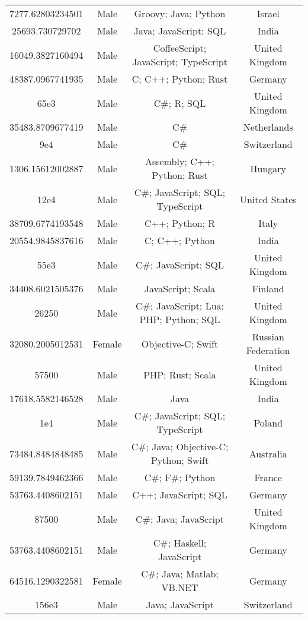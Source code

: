 \begin{center}
\begin{tabular}{ |c|c|c|c| }
7277.62803234501  &  Male  &  Groovy; Java; Python  &  Israel  \\ 
25693.730729702  &  Male  &  Java; JavaScript; SQL  &  India  \\ 
16049.3827160494  &  Male  &  CoffeeScript; JavaScript; TypeScript  &  United Kingdom  \\ 
48387.0967741935  &  Male  &  C; C++; Python; Rust  &  Germany  \\ 
65e3  &  Male  &  C\#; R; SQL  &  United Kingdom  \\ 
35483.8709677419  &  Male  &  C\#  &  Netherlands  \\ 
9e4  &  Male  &  C\#  &  Switzerland  \\ 
1306.15612002887  &  Male  &  Assembly; C++; Python; Rust  &  Hungary  \\ 
12e4  &  Male  &  C\#; JavaScript; SQL; TypeScript  &  United States  \\ 
38709.6774193548  &  Male  &  C++; Python; R  &  Italy  \\ 
20554.9845837616  &  Male  &  C; C++; Python  &  India  \\ 
55e3  &  Male  &  C\#; JavaScript; SQL  &  United Kingdom  \\ 
34408.6021505376  &  Male  &  JavaScript; Scala  &  Finland  \\ 
26250  &  Male  &  C\#; JavaScript; Lua; PHP; Python; SQL  &  United Kingdom  \\ 
32080.2005012531  &  Female  &  Objective-C; Swift  &  Russian Federation  \\ 
57500  &  Male  &  PHP; Rust; Scala  &  United Kingdom  \\ 
17618.5582146528  &  Male  &  Java  &  India  \\ 
1e4  &  Male  &  C\#; JavaScript; SQL; TypeScript  &  Poland  \\ 
73484.8484848485  &  Male  &  C\#; Java; Objective-C; Python; Swift  &  Australia  \\ 
59139.7849462366  &  Male  &  C\#; F\#; Python  &  France  \\ 
53763.4408602151  &  Male  &  C++; JavaScript; SQL  &  Germany  \\ 
87500  &  Male  &  C\#; Java; JavaScript  &  United Kingdom  \\ 
53763.4408602151  &  Male  &  C\#; Haskell; JavaScript  &  Germany  \\ 
64516.1290322581  &  Female  &  C\#; Java; Matlab; VB.NET  &  Germany  \\ 
156e3  &  Male  &  Java; JavaScript  &  Switzerland  \\ 

\end{tabular}
\end{center}
